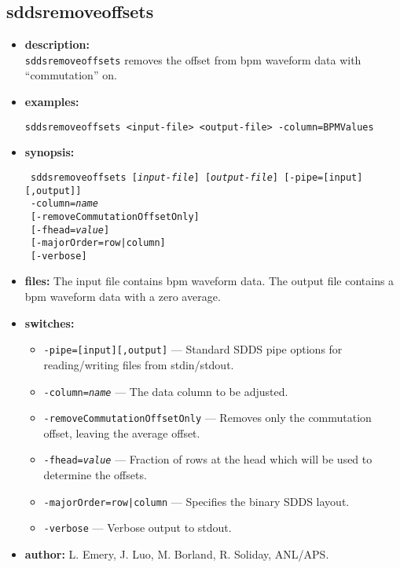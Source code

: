 \newpage 
\subsection{sddsremoveoffsets} 
\label{sddsremoveoffsets} 
 
\begin{itemize} 
\item {\bf description:} \hspace*{1mm}\\ 
{\tt sddsremoveoffsets} removes the offset from bpm waveform data with ``commutation'' on.
\item {\bf examples:} 
\begin{flushleft}
{\tt sddsremoveoffsets <input-file> <output-file> -column=BPMValues }
\end{flushleft} 
\item {\bf synopsis:}  
\begin{flushleft}
{\tt 
sddsremoveoffsets [{\em input-file}] [{\em output-file}] [-pipe=[input][,output]] \\ \
-column={\em name} \\ \
{}[-removeCommutationOffsetOnly] \\ \
{}[-fhead={\em value}] \\ \
{}[-majorOrder=row|column] \\ \
{}[-verbose]}
\end{flushleft} 
\item {\bf files:} 
The input file contains bpm waveform data. The output file contains a bpm waveform data with a zero average. 
\item {\bf switches:} 
    \begin{itemize} 
    \item {\tt -pipe=[input][,output]} --- Standard SDDS pipe options for reading/writing files from stdin/stdout.
    \item {\tt -column={\em name}} --- The data column to be adjusted.
    \item {\tt -removeCommutationOffsetOnly} --- Removes only the commutation offset, leaving the average offset.
    \item {\tt -fhead={\em value}} --- Fraction of rows at the head which will be used to determine the offsets.
    \item {\tt -majorOrder=row|column} --- Specifies the binary SDDS layout.
    \item {\tt -verbose} --- Verbose output to stdout.
\end{itemize} 

\item {\bf author:} L. Emery, J. Luo, M. Borland, R. Soliday, ANL/APS. 
\end{itemize} 
 
